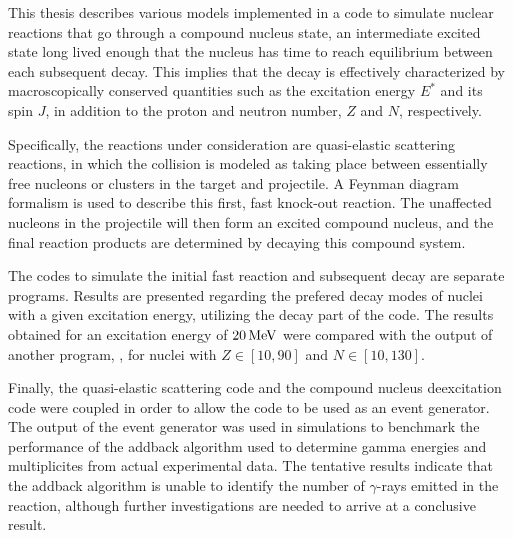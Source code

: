 This thesis describes various models implemented in a code to simulate nuclear reactions that go through a compound nucleus state, an intermediate excited state long lived enough that the nucleus has time to reach equilibrium between each subsequent decay. This implies that the decay is effectively characterized by macroscopically conserved quantities such as the excitation energy $E^*$ and its spin $J$, in addition to the proton and neutron number, $Z$ and $N$, respectively.

Specifically, the reactions under consideration are quasi-elastic scattering reactions, in which the collision is modeled as taking place between essentially free nucleons or clusters in the target and projectile. A Feynman diagram formalism is used to describe this first, fast knock-out reaction.
The unaffected nucleons in the projectile will then form an excited compound nucleus, and the final reaction products are determined by decaying this compound system. 

The codes to simulate the initial fast reaction and subsequent decay are separate programs. Results are presented regarding the prefered decay modes of nuclei with a given excitation energy, utilizing the decay part of the code. The results obtained for an excitation energy of $\unit[20]{MeV}$ were compared with the output of another program, , for nuclei with $Z\in [10,90]$ and $N \in [10,130]$. 

Finally, the quasi-elastic scattering code and the compound nucleus deexcitation code were coupled in order to allow the code to be used as an event generator. The output of the event generator was used in simulations to benchmark the performance of the addback algorithm used to determine gamma energies and multiplicites from actual experimental data. The tentative results indicate that the addback algorithm is unable to identify the number of $\gamma$-rays emitted in the reaction, although further investigations are needed to arrive at a conclusive result.
